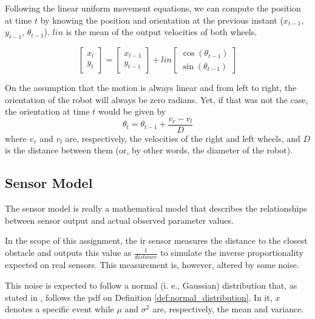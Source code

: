 \documentclass[runningheads]{llncs}
\begin{document}
Following the linear uniform movement equations, we can compute the position at time $t$ by knowing the position and orientation at the previous instant ($x_{t-1}$, $y_{t-1}$, $\theta_{t-1}$). $lin$ is the mean of the output velocities of both wheels.

\begin{equation*}
        \begin{bmatrix}
        x_t\\
        y_t
        \end{bmatrix} 
        =
        \begin{bmatrix}
        x_{t-1}\\
        y_{t-1}
        \end{bmatrix} 
        + lin
        \begin{bmatrix}
        \cos(\theta_{t-1})\\
        \sin(\theta_{t-1})
        \end{bmatrix} 
\end{equation*}

On the assumption that the motion is always linear and from left to right, the orientation of the robot will always be zero radians. Yet, if that was not the case, the orientation at time $t$ would be given by
%
\begin{equation*}
    \theta_t = \theta_{t-1} + \frac{v_r - v_l}{D}
\end{equation*}
%
where $v_r$ and $v_l$ are, respectively, the velocities of the right and left wheels, and $D$ is the distance between them (or, by other words, the diameter of the robot).

\subsection{Sensor Model}
\label{sec:sensor_model}

The sensor model is really a mathematical model that describes the relationships between sensor output and actual observed parameter values.

In the scope of this assignment, the \gls{ir} sensor measures the distance to the closest obstacle and outputs this value as $\frac{1}{distance}$ to simulate the inverse proportionality expected on real sensors. This measurement is, however, altered by some noise. 

This noise is expected to follow a normal (i. e., Gaussian) distribution that, as stated in \cite{thrun2005probabilistic}, follows the \gls{pdf} on Definition \ref{def:normal_distribution}. In it, $x$ denotes a specific event while $\mu$ and $\sigma^2$ are, respectively, the mean and variance.
\end{document}
